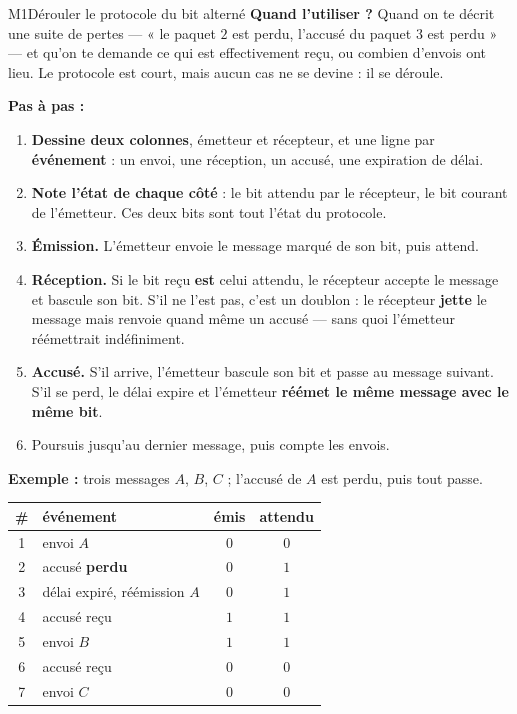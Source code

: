 \begin{fichemethode}{M1}{Dérouler le protocole du bit alterné}
\textbf{Quand l'utiliser ?} Quand on te décrit une suite de pertes — « le paquet $2$ est
perdu, l'accusé du paquet $3$ est perdu » — et qu'on te demande ce qui est effectivement
reçu, ou combien d'envois ont lieu. Le protocole est court, mais aucun cas ne se devine :
il se déroule.

\textbf{Pas à pas :}
\begin{enumerate}
  \item \textbf{Dessine deux colonnes}, émetteur et récepteur, et une ligne par
    \textbf{événement} : un envoi, une réception, un accusé, une expiration de délai.
  \item \textbf{Note l'état de chaque côté} : le bit attendu par le récepteur, le bit
    courant de l'émetteur. Ces deux bits sont tout l'état du protocole.
  \item \textbf{Émission.} L'émetteur envoie le message marqué de son bit, puis attend.
  \item \textbf{Réception.} Si le bit reçu \textbf{est} celui attendu, le récepteur accepte
    le message et bascule son bit. S'il ne l'est pas, c'est un doublon : le récepteur
    \textbf{jette} le message mais renvoie quand même un accusé — sans quoi l'émetteur
    réémettrait indéfiniment.
  \item \textbf{Accusé.} S'il arrive, l'émetteur bascule son bit et passe au message
    suivant. S'il se perd, le délai expire et l'émetteur \textbf{réémet le même message avec
    le même bit}.
  \item Poursuis jusqu'au dernier message, puis compte les envois.
\end{enumerate}

\textbf{Exemple :} trois messages $A$, $B$, $C$ ; l'accusé de $A$ est perdu, puis tout passe.

\begin{center}
\begin{tabular}{c|l|c|c}
\# & événement & émis & attendu \\
\hline
1 & envoi $A$ & $0$ & $0$ \\
2 & accusé \textbf{perdu} & $0$ & $1$ \\
3 & délai expiré, réémission $A$ & $0$ & $1$ \\
4 & accusé reçu & $1$ & $1$ \\
5 & envoi $B$ & $1$ & $1$ \\
6 & accusé reçu & $0$ & $0$ \\
7 & envoi $C$ & $0$ & $0$ \\
\end{tabular}
\end{center}


\end{fichemethode}
